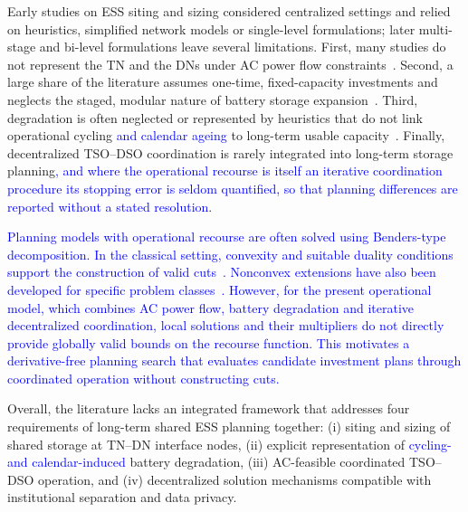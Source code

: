 \documentclass[preprint,12pt]{elsarticle}
\begin{document}
Early studies on ESS siting and sizing considered centralized settings and relied on heuristics, simplified network models or single-level formulations; later multi-stage and bi-level formulations leave several limitations.
First, many studies do not represent the TN and the DNs under AC power flow constraints~\cite{massucco_2021,hassan_2018,feng_2025,najibi_2021,nawaz_2021,papalexopoulos_2020,bragin_2022,qiu_2017}.
Second, a large share of the literature assumes one-time, fixed-capacity investments and neglects the staged, modular nature of battery storage expansion~\cite{pandzic_2015,liu_2016,li_2015,bayram_2017,zhang_2013,hedayati_2014,konstantelos_2015}.
Third, degradation is often neglected or represented by heuristics that do not link operational cycling \textcolor{blue}{and calendar ageing} to long-term usable capacity~\cite{liu_2016,li_2015,bayram_2017,zhang_2013,hedayati_2014,konstantelos_2015,nasrolahpour_2016,xu_2017,motalleb_2016,feng_2025,pandzic_2015,fortenbacher_2016,nick_2018}.
Finally, decentralized TSO--DSO coordination is rarely integrated into long-term storage planning\textcolor{blue}{, and where the operational recourse is itself an iterative coordination procedure its stopping error is seldom quantified, so that planning differences are reported without a stated resolution}.

\textcolor{blue}{
    Planning models with operational recourse are often solved using Benders-type decomposition. In the classical setting, convexity and suitable duality conditions support the construction of valid cuts~\cite{geoffrion_1972}. Nonconvex extensions have also been developed for specific problem classes~\cite{li_tomasgard_barton_2011}. However, for the present operational model, which combines AC power flow, battery degradation and iterative decentralized coordination, local solutions and their multipliers do not directly provide globally valid bounds on the recourse function. This motivates a derivative-free planning search that evaluates candidate investment plans through coordinated operation without constructing cuts.
}

Overall, the literature lacks an integrated framework that addresses four requirements of long-term shared ESS planning together:
(i) siting and sizing of shared storage at TN--DN interface nodes,
(ii) explicit representation of \textcolor{blue}{cycling- and calendar-induced} battery degradation,
(iii) AC-feasible coordinated TSO--DSO operation, and
(iv) decentralized solution mechanisms compatible with institutional separation and data privacy.
\end{document}
